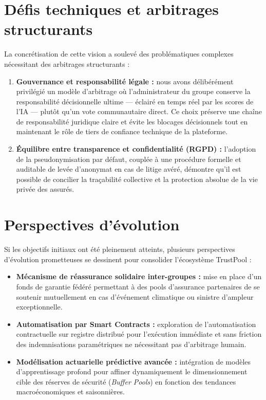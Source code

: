\documentclass[12pt,a4paper]{report}
\begin{document}
\section*{Défis techniques et arbitrages structurants}
La concrétisation de cette vision a soulevé des problématiques complexes nécessitant des arbitrages structurants :
\begin{enumerate}
    \item \textbf{Gouvernance et responsabilité légale :} nous avons délibérément privilégié un modèle d'arbitrage où l'administrateur du groupe conserve la responsabilité décisionnelle ultime — éclairé en temps réel par les scores de l'IA — plutôt qu'un vote communautaire direct. Ce choix préserve une chaîne de responsabilité juridique claire et évite les blocages décisionnels tout en maintenant le rôle de tiers de confiance technique de la plateforme.
    \item \textbf{Équilibre entre transparence et confidentialité (RGPD) :} l'adoption de la pseudonymisation par défaut, couplée à une procédure formelle et auditable de levée d'anonymat en cas de litige avéré, démontre qu'il est possible de concilier la traçabilité collective et la protection absolue de la vie privée des assurés.
\end{enumerate}

\section*{Perspectives d'évolution}
Si les objectifs initiaux ont été pleinement atteints, plusieurs perspectives d'évolution prometteuses se dessinent pour consolider l'écosystème TrustPool :
\begin{itemize}
    \item \textbf{Mécanisme de réassurance solidaire inter-groupes :} mise en place d'un fonds de garantie fédéré permettant à des pools d'assurance partenaires de se soutenir mutuellement en cas d'événement climatique ou sinistre d'ampleur exceptionnelle.
    \item \textbf{Automatisation par Smart Contracts :} exploration de l'automatisation contractuelle sur registre distribué pour l'exécution immédiate et sans friction des indemnisations paramétriques ne nécessitant pas d'arbitrage humain.
    \item \textbf{Modélisation actuarielle prédictive avancée :} intégration de modèles d'apprentissage profond pour affiner dynamiquement le dimensionnement cible des réserves de sécurité (\textit{Buffer Pools}) en fonction des tendances macroéconomiques et saisonnières.
\end{itemize}
\end{document}

